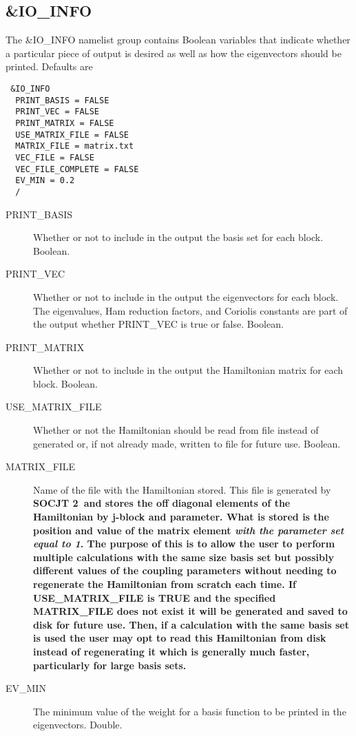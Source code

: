 \documentclass{article}
\newcommand{\socjttwo}{\bf{SOCJT 2}}
\begin{document}
\subsection{\&IO\_INFO}

The \&IO\_INFO namelist group contains Boolean variables that
indicate whether a particular piece of output is desired as well
as how the eigenvectors should be printed. Defaults are

\begin{verbatim}
 &IO_INFO
  PRINT_BASIS = FALSE
  PRINT_VEC = FALSE
  PRINT_MATRIX = FALSE
  USE_MATRIX_FILE = FALSE
  MATRIX_FILE = matrix.txt
  VEC_FILE = FALSE
  VEC_FILE_COMPLETE = FALSE
  EV_MIN = 0.2
  /
\end{verbatim}

\begin{description}

\item[PRINT\_BASIS] Whether or not to include in the output the basis
  set for each block. Boolean.

\item[PRINT\_VEC] Whether or not to include in the output the eigenvectors
  for each block. The eigenvalues, Ham reduction factors, and Coriolis
  constants are part of the output whether PRINT\_VEC is true or
  false. Boolean.

\item[PRINT\_MATRIX] Whether or not to include in the output the Hamiltonian
  matrix for each block. Boolean.
  
  \item[USE\_MATRIX\_FILE] Whether or not the Hamiltonian should be read from file instead of generated or, if not already made, written to file for future use. Boolean.
  
  \item[MATRIX\_FILE] Name of the file with the Hamiltonian stored. This file is generated by \socjttwo\ and stores the off diagonal elements of the Hamiltonian by j-block and parameter. What is stored is the position and value of the matrix element \emph{with the parameter set equal to 1}. The purpose of this is to allow the user to perform multiple calculations with the same size basis set but possibly different values of the coupling parameters without needing to regenerate the Hamiltonian from scratch each time. If USE\_MATRIX\_FILE is TRUE and the specified MATRIX\_FILE does not exist it will be generated and saved to disk for future use. Then, if a calculation with the same basis set is used the user may opt to read this Hamiltonian from disk instead of regenerating it which is generally much faster, particularly for large basis sets. 
  
\item[EV\_MIN] The minimum value of the weight for a basis function to be 
  printed in the eigenvectors. Double.

\end{description}
\end{document}
